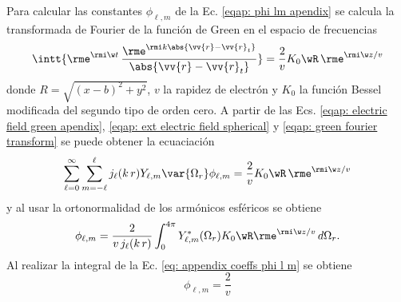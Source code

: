 Para calcular las constantes $\phi_{\ell, m}$ de la Ec. \eqref{eqap: phi lm apendix} se calcula la transformada de Fourier de la función de Green en el espacio de frecuencias \cite{maciel2019electromagnetic}
\begin{equation}
\intt{\rme^{\rmi \w t} \,\frac{\rme^{\rmi k \abs{\vv{r}-\vv{r}_t}}}{\abs{\vv{r}-\vv{r}_t}}} = \frac{2}{v} K_0\wR \, \rme^{\rmi \w z/v}
\label{eqap: green fourier transform}
\end{equation}
donde $R = \sqrt{(x-b)^2+y^2}$, $v$ la rapidez de electrón y $K_0$ la función Bessel modificada del segundo tipo de orden cero. A partir de las Ecs. \eqref{eqap: electric field green apendix}, \eqref{eqap: ext electric field spherical} y \eqref{eqap: green fourier transform} se puede obtener la ecuaciación
\begin{equation}
\sum_{\ell=0}^{\infty}\sum_{m=-\ell}^{\ell} j_{\ell}(k \, r) Y_{\ell,m}\var{\Omega_r} \phi_{\ell, m} = \frac{2}{v} K_0\wR \, \rme^{\rmi \w z/v} 
\end{equation}
y al usar la ortonormalidad de los armónicos esféricos se obtiene
\begin{equation}
\phi_{\ell,m} = \frac{2}{v \,j_{\ell}(k\,r)} \int_{0}^{4\pi} Y_{\ell,m}^{*}(\Omega_r) K_0\wR \rme^{\rmi \w z /v} \, d\Omega_{r}.
\label{eq: appendix coeffs phi l m}
\end{equation}
Al realizar la integral de la Ec.  \eqref{eq: appendix coeffs phi l m} se obtiene  \cite{de1999relativistic}
\begin{equation}
\phi_{\ell,m} = \frac{2}{v}
\end{equation}